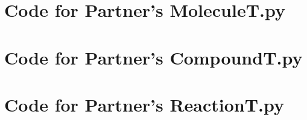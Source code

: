 \documentclass[12pt]{article}
\begin{document}
\noindent 

\newpage

\section{Code for Partner's MoleculeT.py}

\noindent 

\newpage

\section{Code for Partner's CompoundT.py}

\noindent 

\newpage

\section{Code for Partner's ReactionT.py}

\noindent 
\end{document}
